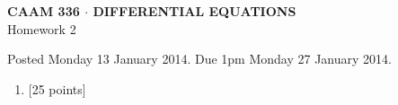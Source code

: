 \documentclass[10pt]{article}
\begin{document}
\vspace*{-5em}
\begin{center}
\large \textsf{\textbf{CAAM 336 $\cdot$ DIFFERENTIAL EQUATIONS}\\[0.5em]
Homework 2 }
\end{center}

Posted Monday 13 January 2014.  Due 1pm Monday 27 January 2014.

\begin{enumerate}\addtocounter{enumi}{1}
\item {[25 points]}\\  
\end{enumerate}
\end{document}
